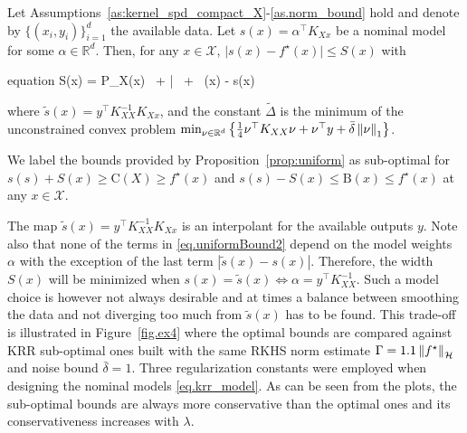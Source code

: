 \begin{proposition}
	\label{prop:uniform}
	Let Assumptions~\ref{as:kernel_spd_compact_X}-\ref{as.norm_bound} hold and denote by $\{(x_i,y_i)\}_{i=1}^d$ the available data. Let $s(x)=\alpha^\top K_{Xx}$ be a nominal model for some $\alpha \in \mathbb{R}^d$. Then, for any $x \in \mathcal{X}$, $\vert s(x) - f^\star(x) \vert \leq S(x)$ with
	\begin{empheq}[box={\mymathbox[colback=black!2,drop small lifted shadow, sharp corners]}]{equation}
		S(x) =  P_X(x) \,  + \bar{\delta} \,  + \, \vert {}(x) - s(x) \vert
		\label{eq.uniformBound2}
	\end{empheq}
	where $\tilde{s}(x) = y^\top K_{XX}^{-1} K_{Xx}$, and the constant $\tilde\Delta$ is the minimum of the unconstrained convex problem $\min_{\nu \in \mathbb{R}^d} \left\{ \frac{1}{4}\nu^\top K_{XX}\nu + \nu^\top y + \bar{\delta} \left\| \nu \right\|_1\right\}$.
\end{proposition}

\begin{remark}
	We label the bounds provided by Proposition~\ref{prop:uniform} as sub-optimal for $s(s) + S(x) \geq \text{C}(X) \geq f^\star(x)$ and $s(s) - S(x) \leq \text{B}(x) \leq f^\star(x)$ at any $x \in \mathcal{X}$.
\end{remark}

The map $\tilde{s}(x) = y^\top K_{XX}^{-1} K_{Xx}$ is an interpolant for the available outputs $y$. Note also that none of the terms in \eqref{eq.uniformBound2} depend on the model weights $\alpha$ with the exception of the last term $|\tilde s(x) - s(x)|$. Therefore, the width $S(x)$ will be minimized when $s(x) = \tilde s(x) \Leftrightarrow \alpha = y^\top K_{XX}^{-1}$. Such a model choice is however not always desirable and at times a balance between smoothing the data and not diverging too much from $\tilde s(x)$ has to be found. This trade-off is illustrated in Figure~\ref{fig.ex4} where the optimal bounds are compared against KRR sub-optimal ones built with the same RKHS norm estimate $\Gamma = 1.1 \left\| f^\star \right\|_\mathcal{H}$ and noise bound $\bar \delta = 1$. Three regularization constants were employed when designing the nominal models \eqref{eq.krr_model}. As can be seen from the plots, the sub-optimal bounds are always more conservative than the optimal ones and its conservativeness increases with $\lambda$.

